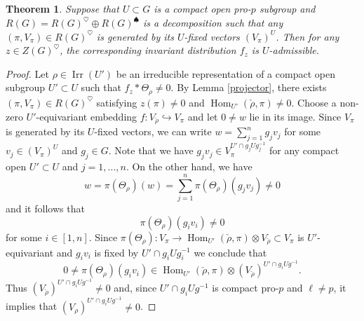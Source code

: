 \documentclass[10pt,a4paper]{amsart}
\newtheorem{thm}{Theorem}
\newcommand{\Hom}{{\on{Hom}}}
\newcommand{\Irr}{\operatorname{Irr}}
\newcommand{\on}{\operatorname}
\begin{document}
\begin{thm}\label{main}
Suppose that $U\subset G$ is a compact open pro-$p$ subgroup and $R(G)=R(G)^{\heartsuit}\oplus R(G)^{\spadesuit}$ is a
 decomposition
such that any $(\pi,V_\pi)\in R(G)^\heartsuit$ is generated by its $U$-fixed vectors $(V_\pi)^U$. Then for any $z\in Z(G)^\heartsuit$,  the corresponding 
invariant distribution $f_z$ is $U$-admissible.
 
\end{thm}

\begin{proof}
Let $\rho\in\Irr(U')$ be an irreducible representation of a compact open subgroup $U'\subset U$
such that  $f_z*\Theta_\rho\neq0$.
By Lemma \ref{projector}, there exists 
 $(\pi,V_\pi)\in R(G)^\heartsuit$ 
 satisfying $z(\pi)\neq0$ and 
 $\Hom_{U'}(\check\rho,\pi)\neq 0$.
Choose a non-zero $U'$-equivariant embedding 
$f:V_{\check\rho}\hookrightarrow V_\pi$ and let 
$0\neq w$ lie in its image. 
Since $V_\pi$ is generated by its $U$-fixed vectors, we can 
write
$w=\sum_{j=1}^n g_jv_j$ for some
$v_j\in (V_\pi)^{U}$ and $g_j\in G$. Note that we have 
$g_jv_j\in V_{\pi}^{U'\cap g_jUg_j^{-1}}$ for 
any compact open $U'\subset U$ and 
$j=1,...,n$. On the other hand, we have
\[w=\pi(\Theta_\rho)(w)=\sum_{j=1}^n\pi(\Theta_\rho)(g_jv_j)\neq 0\]
and it follows that 
\[\pi(\Theta_\rho)(g_iv_i)\neq 0\]
for some $i\in [1,n]$.
Since  $\pi(\Theta_\rho):V_\pi\to \Hom_{U'}(\check\rho,\pi)\otimes V_{\check\rho}\subset V_\pi$
is $U'$-equivariant and 
$g_iv_i$ is fixed by $U'\cap g_iUg_i^{-1}$ we conclude that 
\[0\neq\pi(\Theta_\rho)(g_iv_i)\in\Hom_{U'}(\check\rho,\pi)\otimes (V_{\check\rho})^{U'\cap g_i Ug^{-1}}.\]
Thus $(V_{\check\rho})^{U'\cap g_i Ug^{-1}}\neq0$
and, since $U'\cap g_i Ug^{-1}$ is compact
 pro-$p$ and $\ell\neq p$, it implies that 
$(V_\rho)^{U'\cap g_i Ug^{-1}}\neq0$.
\end{proof}
\end{document}
